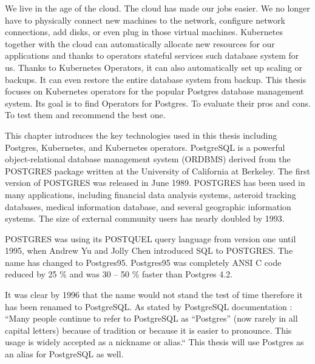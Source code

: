 
We live in the age of the cloud. The cloud has made our jobs easier. We no longer have to physically connect new machines to the network, configure network connections, add disks, or even plug in those virtual machines. Kubernetes together with the cloud can automatically allocate new resources for our applications and thanks to operators stateful services such database system
for us. Thanks to Kubernetes Operators, it can also automatically set up scaling or backups. It can even restore the entire database system from backup. This thesis focuses on Kubernetes operators for the popular Postgres database management system. Its goal is to find Operators for Postgres. To evaluate their pros and cons. To test them and recommend the best one.


This chapter introduces the key technologies used in this thesis including Postgres, Kubernetes, and Kubernetes operators.
PostgreSQL is a powerful object-relational database management system (ORDBMS) derived from the POSTGRES package written at the University of California at Berkeley. \cite{docuPgwhatIsPg} \cite{pg14introduction} The first version of POSTGRES was released in June 1989. POSTGRES has been used in many applications, including financial data analysis systems, asteroid tracking databases, medical information database, and several geographic information systems. The size of external community users has nearly doubled by 1993. \cite{docuPgBriefHistory}

POSTGRES was using its POSTQUEL query language from version one until 1995, when Andrew Yu and Jolly Chen introduced SQL to POSTGRES. The name has changed to Postgres95. Postgres95 was completely ANSI C code reduced by 25 \% and was 30 – 50 \% faster than Postgres 4.2.  \cite{docuPgBriefHistory}

It was clear by 1996 that the name would not stand the test of time therefore it has been renamed to PostgreSQL. As stated by PostgreSQL documentation \cite{docuPgBriefHistory}: “Many people continue to refer to PostgreSQL as “Postgres” (now rarely in all capital letters) because of tradition or because it is easier to pronounce. This usage is widely accepted as a nickname or alias.“ This thesis will use Postgres as an alias for PostgreSQL as well.

